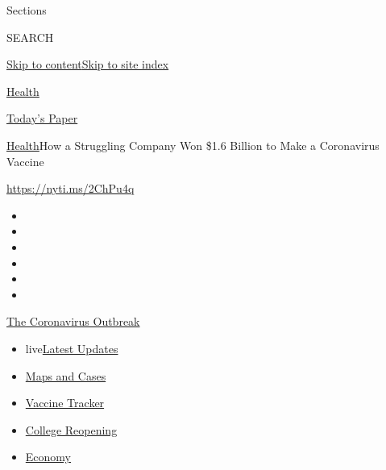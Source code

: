 Sections

SEARCH

\protect\hyperlink{site-content}{Skip to
content}\protect\hyperlink{site-index}{Skip to site index}

\href{https://www.nytimes3xbfgragh.onion/section/health}{Health}

\href{https://myaccount.nytimes3xbfgragh.onion/auth/login?response_type=cookie\&client_id=vi}{}

\href{https://www.nytimes3xbfgragh.onion/section/todayspaper}{Today's
Paper}

\href{/section/health}{Health}\textbar{}How a Struggling Company Won
\$1.6 Billion to Make a Coronavirus Vaccine

\url{https://nyti.ms/2ChPu4q}

\begin{itemize}
\item
\item
\item
\item
\item
\item
\end{itemize}

\href{https://www.nytimes3xbfgragh.onion/news-event/coronavirus?action=click\&pgtype=Article\&state=default\&region=TOP_BANNER\&context=storylines_menu}{The
Coronavirus Outbreak}

\begin{itemize}
\tightlist
\item
  live\href{https://www.nytimes3xbfgragh.onion/2020/08/03/world/coronavirus-covid-19.html?action=click\&pgtype=Article\&state=default\&region=TOP_BANNER\&context=storylines_menu}{Latest
  Updates}
\item
  \href{https://www.nytimes3xbfgragh.onion/interactive/2020/us/coronavirus-us-cases.html?action=click\&pgtype=Article\&state=default\&region=TOP_BANNER\&context=storylines_menu}{Maps
  and Cases}
\item
  \href{https://www.nytimes3xbfgragh.onion/interactive/2020/science/coronavirus-vaccine-tracker.html?action=click\&pgtype=Article\&state=default\&region=TOP_BANNER\&context=storylines_menu}{Vaccine
  Tracker}
\item
  \href{https://www.nytimes3xbfgragh.onion/2020/08/02/us/covid-college-reopening.html?action=click\&pgtype=Article\&state=default\&region=TOP_BANNER\&context=storylines_menu}{College
  Reopening}
\item
  \href{https://www.nytimes3xbfgragh.onion/live/2020/08/03/business/stock-market-today-coronavirus?action=click\&pgtype=Article\&state=default\&region=TOP_BANNER\&context=storylines_menu}{Economy}
\end{itemize}

